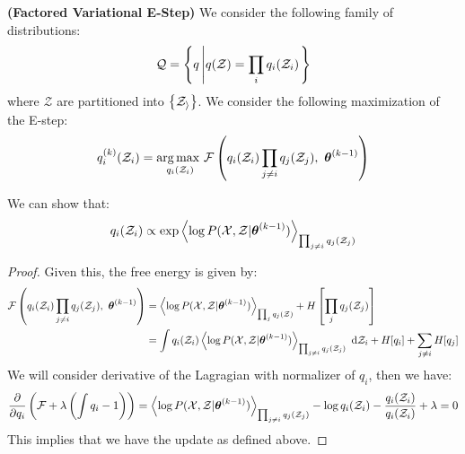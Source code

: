 \begin{definition}{\textbf{(Factored Variational E-Step)}}
    We consider the following family of distributions:
    \begin{equation*}
        \mathcal{Q} = \left\{ q \left| q(\mathcal{Z}) = \prod_i q_i(\mathcal{Z}_i) \right. \right\}
    \end{equation*}
    where $\mathcal{Z}$ are partitioned into $\left\{ \mathcal{Z_i} \right\}$. We consider the following maximization of the E-step:
    \begin{equation*}
        q^{(k)}_i (\mathcal{Z}_i) =\underset{q_i(\mathcal{Z}_i)}{\arg\max \ }\mathcal{F}\left( q_i(\mathcal{Z}_i)\prod_{j\ne i}q_j(\mathcal{Z}_j), \ \boldsymbol \theta^{(k-1)} \right)
    \end{equation*}
\end{definition}

\begin{proposition}
    We can show that:
    \begin{equation*}
        q_i(\mathcal{Z}_i) \propto \exp\left\langle \log P(\mathcal{X}, \mathcal{Z} | \boldsymbol \theta^{(k-1)}) \right\rangle_{\prod_{j\ne i}q_j(\mathcal{Z}_j)}
    \end{equation*}
\end{proposition}
\begin{proof}
    Given this, the free energy is given by:
    \begin{equation*}
    \begin{aligned}
        \mathcal{F}\left( q_i(\mathcal{Z}_i)\prod_{j\ne i}q_j(\mathcal{Z}_j), \ \boldsymbol \theta^{(k-1)} \right) &= \left\langle \log P(\mathcal{X}, \mathcal{Z} | \boldsymbol \theta^{(k-1)}) \right\rangle_{\prod_jq_j(\mathcal{Z})} + H\left[ \prod_j q_j(\mathcal{Z}_j) \right] \\
        &= \int q_i(\mathcal{Z}_i)\left\langle \log P(\mathcal{X}, \mathcal{Z} | \boldsymbol \theta^{(k-1)}) \right\rangle_{\prod_{j\ne i}q_j(\mathcal{Z}_j)}\ \mathrm{d} \mathcal{Z}_i  + H[q_i] + \sum_{j\ne i}H[q_j]
    \end{aligned}
    \end{equation*}
    We will consider derivative of the Lagragian with normalizer of $q_i$, then we have:
    \begin{equation*}
        \frac{\partial}{\partial q_i}\left( \mathcal{F} + \lambda\left( \int q_i - 1 \right) \right) = \left\langle \log P(\mathcal{X}, \mathcal{Z} | \boldsymbol \theta^{(k-1)}) \right\rangle_{\prod_{j\ne i}q_j(\mathcal{Z}_j)} - \log q_i(\mathcal{Z}_i) - \frac{q_i(\mathcal{Z}_i)}{q_i(\mathcal{Z}_i)} + \lambda =0
    \end{equation*}
    This implies that we have the update as defined above.
\end{proof}


